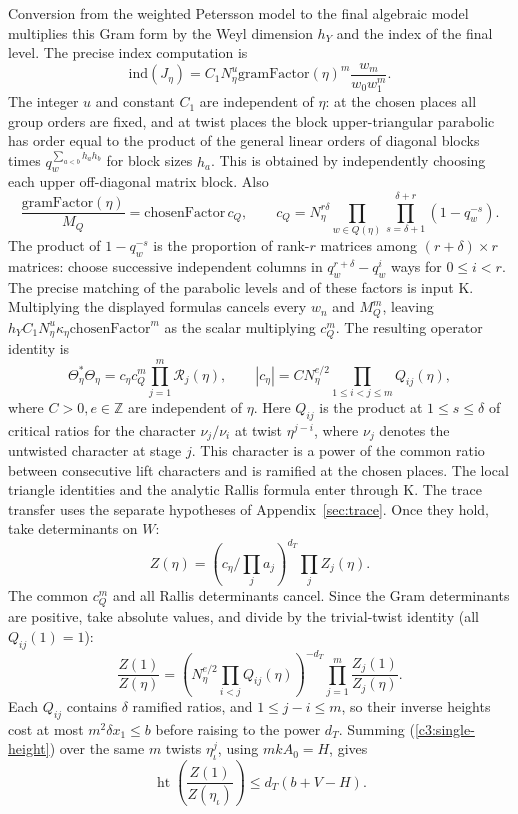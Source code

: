 Conversion from the weighted Petersson model to the final
algebraic model multiplies this Gram form by the Weyl dimension
$h_Y$ and the index of the final level. The precise index
computation is
\[
 \mathrm{ind}(J_\eta)=C_1 N_\eta^u
     \mathrm{gramFactor}(\eta)^m\frac{w_m}{w_0w_1^m}.
\]
The integer $u$ and constant $C_1$ are independent of $\eta$:
at the chosen places all group orders are fixed, and at twist
places the block upper-triangular parabolic has order equal to the
product of the general linear orders of diagonal blocks times
$q_w^{\sum_{a<b}h_a h_b}$ for block sizes $h_a$.
This is obtained by independently choosing each upper off-diagonal
matrix block. Also
\[
 \frac{\mathrm{gramFactor}(\eta)}{M_Q}
 = \mathrm{chosenFactor}\,c_Q,\qquad
 c_Q=N_\eta^{r\delta}\prod_{w\in Q(\eta)}
                      \prod_{s=\delta+1}^{\delta+r}(1-q_w^{-s}).
\]
The product of $1-q_w^{-s}$ is the proportion of rank-$r$
matrices among $(r+\delta)\times r$ matrices: choose successive
independent columns in $q_w^{r+\delta}-q_w^i$ ways for $0\le i<r$.
The precise matching of the parabolic levels and of these factors
is input K. Multiplying the displayed formulas cancels every
$w_n$ and $M_Q^m$, leaving $h_Y C_1 N_\eta^u
\kappa_\eta\mathrm{chosenFactor}^m$ as the scalar multiplying
$c_Q^m$. The resulting operator identity is
\[
 \Theta_\eta^*\Theta_\eta
 =c_\eta c_Q^m\prod_{j=1}^m\mathcal R_j(\eta),\qquad
 |c_\eta|=C N_\eta^{e/2}\prod_{1\le i<j\le m}Q_{ij}(\eta),
\]
where $C>0,e\in\mathbb Z$ are independent of $\eta$. Here
$Q_{ij}$ is the product at $1\le s\le\delta$ of critical ratios
for the character $\nu_j/\nu_i$ at twist $\eta^{j-i}$,
where $\nu_j$ denotes the untwisted character at stage $j$.
This character is a power of the common ratio between consecutive
lift characters and is ramified at the chosen places.
The local triangle identities and the analytic Rallis formula
enter through K. The trace transfer uses the separate hypotheses
of Appendix~\ref{sec:trace}. Once they hold, take
determinants on $W$:
\[
 Z(\eta)=
 \left(c_\eta/\prod_j a_j\right)^{d_T}\prod_j Z_j(\eta).
\]
The common $c_Q^m$ and all Rallis determinants cancel. Since the
Gram determinants are positive, take absolute values, and divide by
the trivial-twist identity (all $Q_{ij}(1)=1$):
\begin{equation}\label{c3:chainfactor}
 \frac{Z(1)}{Z(\eta)}=
 \left(N_\eta^{e/2}\prod_{i<j}Q_{ij}(\eta)\right)^{-d_T}
 \prod_{j=1}^{m}\frac{Z_j(1)}{Z_j(\eta)} .
\end{equation}
Each $Q_{ij}$ contains $\delta$ ramified ratios, and $1\le j-i\le m$,
so their inverse heights cost at most $m^2\delta x_1\le b$ before
raising to the power $d_T$. Summing (\ref{c3:single-height}) over
the same $m$ twists $\eta_\iota^j$, using $mkA_0=H$, gives
\begin{equation}\label{c3:chainheight}
 \operatorname{ht}\left(\frac{Z(1)}{Z(\eta_\iota)}\right)
 \le d_T(b+V-H).
\end{equation}


